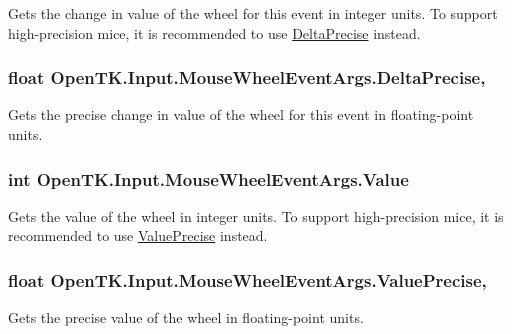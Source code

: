Gets the change in value of the wheel for this event in integer units. To support high-\/precision mice, it is recommended to use \hyperlink{class_open_t_k_1_1_input_1_1_mouse_wheel_event_args_a9ba689417b32b99c1971aa541d8765e2}{Delta\-Precise} instead. 

\hypertarget{class_open_t_k_1_1_input_1_1_mouse_wheel_event_args_a9ba689417b32b99c1971aa541d8765e2}{
\subsubsection[{Delta\-Precise}]{\setlength{\rightskip}{0pt plus 5cm}float Open\-T\-K.\-Input.\-Mouse\-Wheel\-Event\-Args.\-Delta\-Precise\hspace{0.3cm}{\ttfamily [get]}, {\ttfamily [set]}}}\label{class_open_t_k_1_1_input_1_1_mouse_wheel_event_args_a9ba689417b32b99c1971aa541d8765e2}


Gets the precise change in value of the wheel for this event in floating-\/point units. 

\hypertarget{class_open_t_k_1_1_input_1_1_mouse_wheel_event_args_a34daefff9cfbd400ac5d6af00a8118c3}{
\subsubsection[{Value}]{\setlength{\rightskip}{0pt plus 5cm}int Open\-T\-K.\-Input.\-Mouse\-Wheel\-Event\-Args.\-Value\hspace{0.3cm}{\ttfamily [get]}}}\label{class_open_t_k_1_1_input_1_1_mouse_wheel_event_args_a34daefff9cfbd400ac5d6af00a8118c3}


Gets the value of the wheel in integer units. To support high-\/precision mice, it is recommended to use \hyperlink{class_open_t_k_1_1_input_1_1_mouse_wheel_event_args_a924698cde619be6ceb51cd318a990b55}{Value\-Precise} instead. 

\hypertarget{class_open_t_k_1_1_input_1_1_mouse_wheel_event_args_a924698cde619be6ceb51cd318a990b55}{
\subsubsection[{Value\-Precise}]{\setlength{\rightskip}{0pt plus 5cm}float Open\-T\-K.\-Input.\-Mouse\-Wheel\-Event\-Args.\-Value\-Precise\hspace{0.3cm}{\ttfamily [get]}, {\ttfamily [set]}}}\label{class_open_t_k_1_1_input_1_1_mouse_wheel_event_args_a924698cde619be6ceb51cd318a990b55}


Gets the precise value of the wheel in floating-\/point units. 

